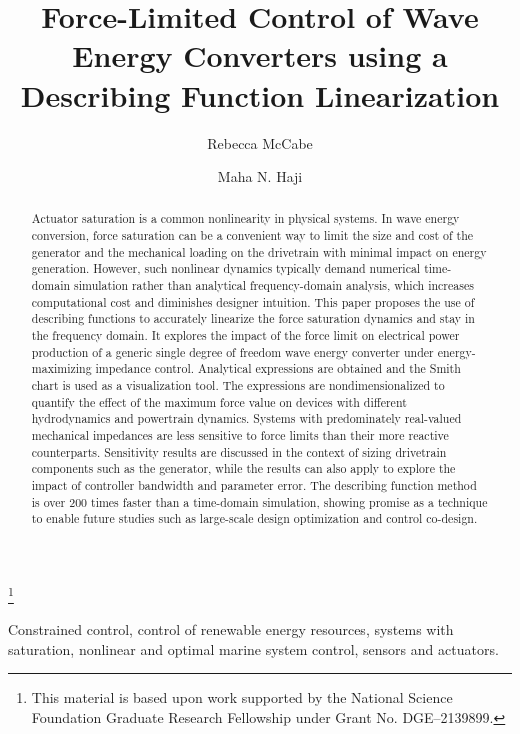 \documentclass{ifacconf}
\begin{document}
\begin{frontmatter}

\title{Force-Limited Control of Wave Energy Converters using a Describing Function Linearization} 

\thanks[footnoteinfo]{This material is based upon work supported by the National Science Foundation Graduate Research Fellowship under Grant No. DGE–2139899.}

\author[First]{Rebecca McCabe} 
\author[Second]{Maha N. Haji} 
\address*{Sibley School of Mechanical and Aerospace Engineering, Cornell University, 
   Ithaca, NY 14853 USA }
   \address[First]{e-mail: rgm222@cornell.edu}
   \address[Second]{e-mail: maha@cornell.edu}

\begin{abstract}                %
Actuator saturation is a common nonlinearity in physical systems. In wave energy conversion, force saturation can be a convenient way to limit the size and cost of the generator and the mechanical loading on the drivetrain with minimal impact on energy generation. However, such nonlinear dynamics typically demand numerical time-domain simulation rather than analytical frequency-domain analysis, which increases computational cost and diminishes designer intuition. This paper proposes the use of describing functions to accurately linearize the force saturation dynamics and stay in the frequency domain. It explores the impact of the force limit on electrical power production of a generic single degree of freedom wave energy converter under energy-maximizing impedance control. Analytical expressions are obtained and the Smith chart is used as a visualization tool. The expressions are nondimensionalized to quantify the effect of the maximum force value on devices with different hydrodynamics and powertrain dynamics. Systems with predominately real-valued mechanical impedances are less sensitive to force limits than their more reactive counterparts. Sensitivity results are discussed in the context of sizing drivetrain components such as the generator, while the results can also apply to explore the impact of controller bandwidth and parameter error. The describing function method is over 200 times faster than a time-domain simulation,
showing promise as a technique to enable future studies such as large-scale design optimization and control co-design.
\end{abstract}

\begin{keyword}
Constrained control, control of renewable energy resources, systems with saturation, nonlinear and optimal marine system control, sensors and actuators.
\end{keyword}

\end{frontmatter}
\end{document}
